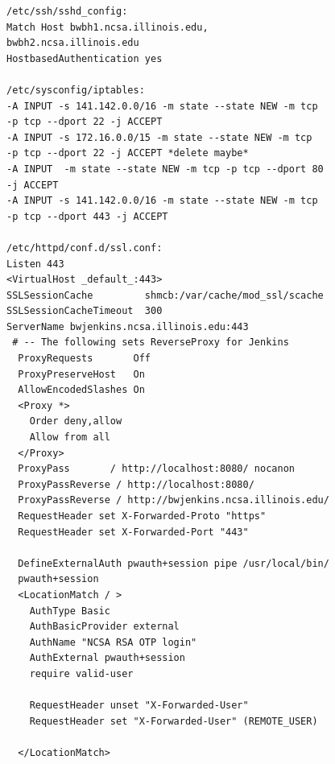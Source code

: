 \documentclass[10pt, conference, compsocconf]{IEEEtran}
\begin{document}
\begin{lstlisting}
/etc/ssh/sshd_config:
Match Host bwbh1.ncsa.illinois.edu,
bwbh2.ncsa.illinois.edu
HostbasedAuthentication yes

/etc/sysconfig/iptables:
-A INPUT -s 141.142.0.0/16 -m state --state NEW -m tcp 
-p tcp --dport 22 -j ACCEPT
-A INPUT -s 172.16.0.0/15 -m state --state NEW -m tcp 
-p tcp --dport 22 -j ACCEPT *delete maybe*
-A INPUT  -m state --state NEW -m tcp -p tcp --dport 80 
-j ACCEPT
-A INPUT -s 141.142.0.0/16 -m state --state NEW -m tcp 
-p tcp --dport 443 -j ACCEPT

/etc/httpd/conf.d/ssl.conf:
Listen 443
<VirtualHost _default_:443>
SSLSessionCache         shmcb:/var/cache/mod_ssl/scache
SSLSessionCacheTimeout  300
ServerName bwjenkins.ncsa.illinois.edu:443
 # -- The following sets ReverseProxy for Jenkins
  ProxyRequests       Off
  ProxyPreserveHost   On
  AllowEncodedSlashes On
  <Proxy *>
    Order deny,allow
    Allow from all
  </Proxy>
  ProxyPass       / http://localhost:8080/ nocanon
  ProxyPassReverse / http://localhost:8080/
  ProxyPassReverse / http://bwjenkins.ncsa.illinois.edu/
  RequestHeader set X-Forwarded-Proto "https"
  RequestHeader set X-Forwarded-Port "443"

  DefineExternalAuth pwauth+session pipe /usr/local/bin/
  pwauth+session
  <LocationMatch / > 
    AuthType Basic
    AuthBasicProvider external
    AuthName "NCSA RSA OTP login" 
    AuthExternal pwauth+session
    require valid-user
    
    RequestHeader unset "X-Forwarded-User"
    RequestHeader set "X-Forwarded-User" (REMOTE_USER)

  </LocationMatch>
\end{lstlisting}
\end{document}
